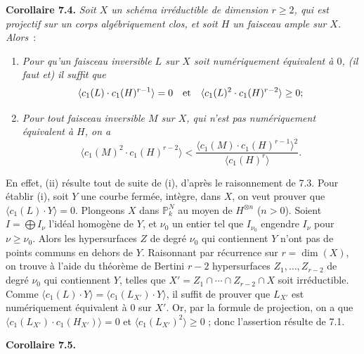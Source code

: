 \textbf{Corollaire 7.4.} \emph{Soit $X$ un sch\'ema irr\'eductible de dimension $r\geq2$, qui est projectif sur un corps alg\'ebriquement clos, et soit $H$ un faisceau ample sur $X$. Alors}~:
\begin{enumerate}[label=(\roman*)]
\item \emph{Pour qu'un faisceau inversible $L$ sur $X$ soit num\'eriquement \'equivalent \`a $0$, (il faut et) il suffit que}
\[
   \langle c_1(L)\cdot c_1(H)^{r-1}\rangle=0
   \quad\hbox{et}\quad
   \langle c_1(L)^2\cdot c_1(H)^{r-2}\rangle\geq0;
\]
\item \emph{Pour tout faisceau inversible $M$ sur $X$, qui n'est pas num\'eriquement \'equivalent \`a $H$, on a}
\[
   \langle c_1(M)^2\cdot c_1(H)^{r-2}\rangle
   <
   \frac{\langle c_1(M)\cdot c_1(H)^{r-1}\rangle^2}
        {\langle c_1(H)^r\rangle}.
\]
\end{enumerate}
En effet, (ii) r\'esulte tout de suite de (i), d'apr\`es le raisonnement de 7.3. Pour \'etablir (i), soit $Y$ une courbe ferm\'ee, int\`egre, dans $X$, on veut prouver que $\langle c_1(L)\cdot Y\rangle=0$. Plongeons $X$ dans $\mathbb P^N_k$ au moyen de $H^{\otimes n}$ ($n>0$). Soient $I=\bigoplus I_\nu$ l'id\'eal homog\`ene de $Y$, et $\nu_0$ un entier tel que $I_{\nu_0}$ engendre $I_\nu$ pour $\nu\geq\nu_0$. Alors les hypersurfaces $Z$ de degr\'e $\nu_0$ qui contiennent $Y$ n'ont pas de points communs en dehors de $Y$. Raisonnant par r\'ecurrence sur $r=\dim(X)$, on trouve \`a l'aide du th\'eor\`eme de Bertini $r-2$ hypersurfaces $Z_1,\ldots,Z_{r-2}$ de degr\'e $\nu_0$ qui contiennent $Y$, telles que $X'=Z_1\cap\cdots\cap Z_{r-2}\cap X$ soit irr\'eductible. Comme $\langle c_1(L)\cdot Y\rangle=\langle c_1(L_{X'})\cdot Y\rangle$, il suffit de prouver que $L_{X'}$ est num\'eriquement \'equivalent \`a $0$ sur $X'$. Or, par la formule de projection, on a que $\langle c_1(L_{X'})\cdot c_1(H_{X'})\rangle=0$ et $\langle c_1(L_{X'})^2\rangle\geq0$ ; donc l'assertion r\'esulte de 7.1.

\textbf{Corollaire 7.5.}
